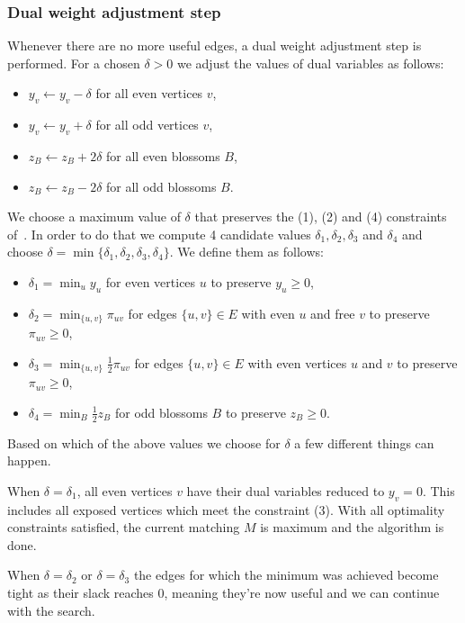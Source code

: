 \subsubsection*{Dual weight adjustment step}

Whenever there are no more useful edges, a dual weight adjustment step is performed. For a chosen $\delta > 0$ we adjust the values of dual variables as follows:

\begin{itemize}
    \item $y_v \gets y_v - \delta$ for all even vertices $v$,
    \item $y_v \gets y_v + \delta$ for all odd vertices $v$,
    \item $z_B \gets z_B + 2\delta$ for all even blossoms $B$,
    \item $z_B \gets z_B - 2\delta$ for all odd blossoms $B$.
\end{itemize}

We choose a maximum value of $\delta$ that preserves the (1), (2) and (4) constraints of~. In order to do that we compute 4 candidate values $\delta_1, \delta_2, \delta_3$ and $\delta_4$ and choose $\delta = \min \{\delta_1, \delta_2, \delta_3, \delta_4\}$. We define them as follows:

\begin{itemize}
    \item $\delta_1 = \min_{u} y_u$ for even vertices $u$ to preserve $y_u \geq 0$,
    \item $\delta_2 = \min_{\{u, v\}} \pi_{uv}$ for edges $\{u, v\} \in E$ with even $u$ and free $v$ to preserve $\pi_{uv} \geq 0$,
    \item $\delta_3 = \min_{\{u, v\}} \frac{1}{2}\pi_{uv}$ for edges $\{u, v\} \in E$ with even vertices $u$ and $v$ to preserve $\pi_{uv} \geq 0$,
    \item $\delta_4 = \min_{B} \frac{1}{2} z_B$ for odd blossoms $B$ to preserve $z_B \geq 0$.
\end{itemize}

Based on which of the above values we choose for $\delta$ a few different things can happen.

When $\delta = \delta_1$, all even vertices $v$ have their dual variables reduced to $y_v = 0$. This includes all exposed vertices which meet the constraint (3). With all optimality constraints satisfied, the current matching $M$ is maximum and the algorithm is done.

When $\delta = \delta_2$ or $\delta = \delta_3$ the edges for which the minimum was achieved become tight as their slack reaches $0$, meaning they're now useful and we can continue with the search.

